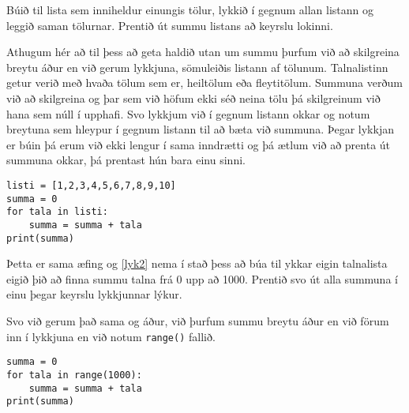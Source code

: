 \begin{exercise}\label{lyk2}
Búið til lista sem inniheldur einungis tölur, lykkið í gegnum allan listann og leggið saman tölurnar.
Prentið út summu listans að keyrslu lokinni.
\end{exercise}
\begin{Answer}[ref={lyk2}]
Athugum hér að til þess að geta haldið utan um summu þurfum við að skilgreina breytu áður en við gerum lykkjuna, sömuleiðis listann af tölunum.
Talnalistinn getur verið með hvaða tölum sem er, heiltölum eða fleytitölum.
Summuna verðum við að skilgreina og þar sem við höfum ekki séð neina tölu þá skilgreinum við hana sem núll í upphafi.
Svo lykkjum við í gegnum listann okkar og notum breytuna sem hleypur í gegnum listann til að bæta við summuna.
Þegar lykkjan er búin þá erum við ekki lengur í sama inndrætti og þá ætlum við að prenta út summuna okkar, þá prentast hún bara einu sinni.
 
\begin{lstlisting}
listi = [1,2,3,4,5,6,7,8,9,10]
summa = 0
for tala in listi:
	summa = summa + tala
print(summa)\end{lstlisting}
\end{Answer}

\begin{exercise}\label{lyk3}
Þetta er sama æfing og \ref{lyk2} nema í stað þess að búa til ykkar eigin talnalista eigið þið að finna summu talna frá 0 upp að 1000.
Prentið svo út alla summuna í einu þegar keyrslu lykkjunnar lýkur.
\end{exercise}
\begin{Answer}[ref={lyk3}]
Svo við gerum það sama og áður, við þurfum summu breytu áður en við förum inn í lykkjuna en við notum \texttt{range()} fallið.
	
\begin{lstlisting}
summa = 0
for tala in range(1000):
	summa = summa + tala
print(summa)\end{lstlisting}
\end{Answer}

